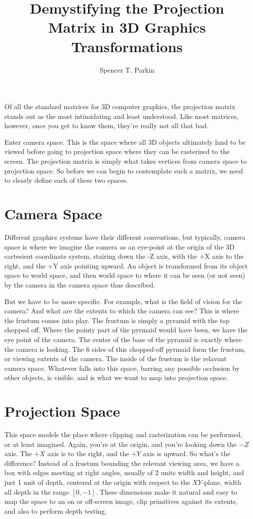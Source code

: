 \documentclass[12pt]{article}
\title{Demystifying the Projection Matrix in 3D Graphics Transformations}
\author{Spencer T. Parkin}
\begin{document}
\maketitle

Of all the standard matrices for 3D computer graphics, the projection matrix stands out as the most intimidating and least understood.  Like most matrices, however, once you get to know them, they're really not all that bad.

Enter camera space.  This is the space where all 3D objects ultimately land to be viewed before going to projection space where they can be rasterized to the screen.  The projection matrix is simply what takes vertices from camera space to projection space.  So before we can begin to contemplate such a matrix, we need to clearly define each of these two spaces.

\section*{Camera Space}

Different graphics systems have their different conventions, but typically, camera space is where we imagine the camera as an eye-point at the origin of the 3D cartesient coordinate system, stairing down the -Z axis, with the +X axis to the right, and the +Y axis pointing upward.  An object is transformed from its object space to world space, and then world space to where it can be seen (or not seen) by the camera in the camera space thus described.

But we have to be more specific.  For example, what is the field of vision for the camera?  And what are the extents to which the camera can see?  This is where the frustum comes into play.  The frustum is simply a pyramid with the top chopped off.  Where the pointy part of the pyrmaid would have been, we have the eye point of the camera.  The center of the base of the pyramid is exactly where the camera is looking.  The 6 sides of this chopped-off pyrmaid form the frustum, or viewing extents of the camera.  The inside of the frustum is the relavant camera space.  Whatever falls into this space, barring any possible occlusion by other objects, is visible, and is what we want to map into projection space.

\section*{Projection Space}

This space models the place where clipping and rasterization can be performed, or at least imagined.  Again, you're at the origin, and you're looking down the $-Z$ axis.  The $+X$ axis is to the right, and the $+Y$ axis is upward.  So what's the difference?  Instead of a frustum bounding the relevant viewing area, we have a box with edges meeting at right angles, usually of 2 units width and height, and just 1 unit of depth, centered at the origin with respect to the $XY$-plane, width all depth in the range $[0,-1]$.  These dimensions make it natural and easy to map the space to an on or off-screen image, clip primitives against its extents, and also to perform depth testing.
\end{document}
